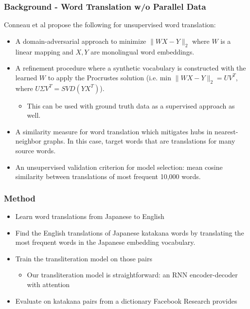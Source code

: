 \documentclass{beamer}
\begin{document}
\begin{frame}
  \frametitle{Background - Word Translation w/o Parallel Data}
  Conneau et al propose the following for unsupervised word translation:
  \begin{itemize}
    \item A domain-adversarial approach to minimize $\|WX-Y\|_2$ where $W$ is
      a linear mapping and $X,Y$ are monolingual word embeddings.
    \item A refinement procedure where a synthetic vocabulary is constructed
      with the learned $W$ to apply the Procrustes solution (i.e.
      min $\|WX-Y\|_2 = UV^T$, where $U\Sigma V^T = SVD(YX^T)$).
      \begin{itemize}
        \item This can be used with ground truth data as a supervised
          approach as well.
      \end{itemize}
    \item A similarity measure for word translation which mitigates hubs in
      nearest-neighbor graphs. In this case, target words that are translations
      for many source words.
    \item An unsupervised validation criterion for model selection: mean
      cosine similarity between translations of most frequent 10,000 words.
  \end{itemize}

\end{frame}

\begin{frame}
  \frametitle{Method}
  \begin{itemize}
  \item Learn word translations from Japanese to English
  \item Find the English translations of Japanese katakana words by translating
    the most frequent words in the Japanese embedding vocabulary.
  \item Train the transliteration model on those pairs
    \begin{itemize}
    \item Our transliteration model is straightforward: an RNN encoder-decoder with
      attention
    \end{itemize}
  \item Evaluate on katakana pairs from a dictionary Facebook Research provides
  \end{itemize}
\end{frame}
\end{document}

